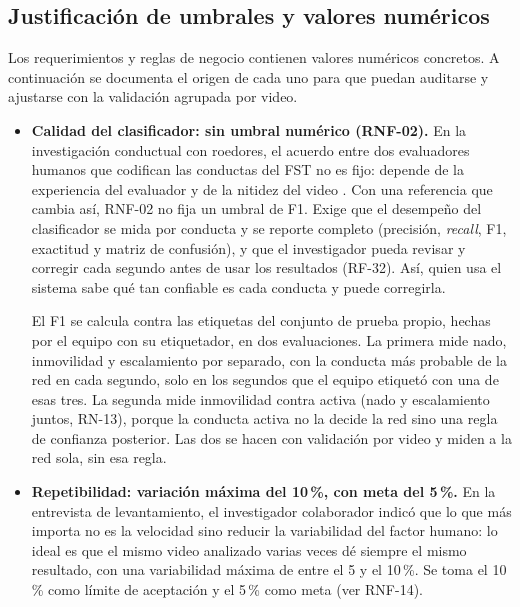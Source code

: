 \subsection{Justificación de umbrales y valores numéricos}
\label{sec:umbrales}

Los requerimientos y reglas de negocio contienen valores numéricos concretos.
A continuación se documenta el origen de cada uno para que puedan auditarse y
ajustarse con la validación agrupada por video.

\begin{itemize}
  \item \textbf{Calidad del clasificador: sin umbral numérico (RNF-02).}
        En la investigación conductual con roedores, el acuerdo entre dos evaluadores
        humanos que codifican las conductas del FST no es fijo: depende de la
        experiencia del evaluador y de la nitidez del video
        \cite{slattery2012,della_valle2025}. Con una referencia que cambia así,
        RNF-02 no fija un umbral de F1. Exige que el desempeño del clasificador se
        mida por conducta y se reporte completo (precisión, \textit{recall}, F1,
        exactitud y matriz de confusión), y que el investigador pueda revisar y
        corregir cada segundo antes de usar los resultados (RF-32). Así, quien usa el
        sistema sabe qué tan confiable es cada conducta y puede corregirla.

        El F1 se calcula contra las etiquetas del conjunto de prueba propio, hechas
        por el equipo con su etiquetador, en dos evaluaciones. La primera mide nado,
        inmovilidad y escalamiento por separado, con la conducta más probable de la red
        en cada segundo, solo en los segundos que el equipo etiquetó con una de esas
        tres. La segunda mide inmovilidad contra activa (nado y escalamiento juntos,
        RN-13), porque la conducta activa no la decide la red sino una regla de
        confianza posterior. Las dos se hacen con validación por video y miden a la red
        sola, sin esa regla.

  \item \textbf{Repetibilidad: variación máxima del 10\,\%, con meta del 5\,\%.}
        En la entrevista de levantamiento, el investigador colaborador indicó que lo
        que más importa no es la velocidad sino reducir la variabilidad del factor
        humano: lo ideal es que el mismo video analizado varias veces dé siempre el
        mismo resultado, con una variabilidad máxima de entre el 5 y el 10\,\%. Se toma el 10\,\% como
        límite de aceptación y el 5\,\% como meta (ver RNF-14).


\end{itemize}
